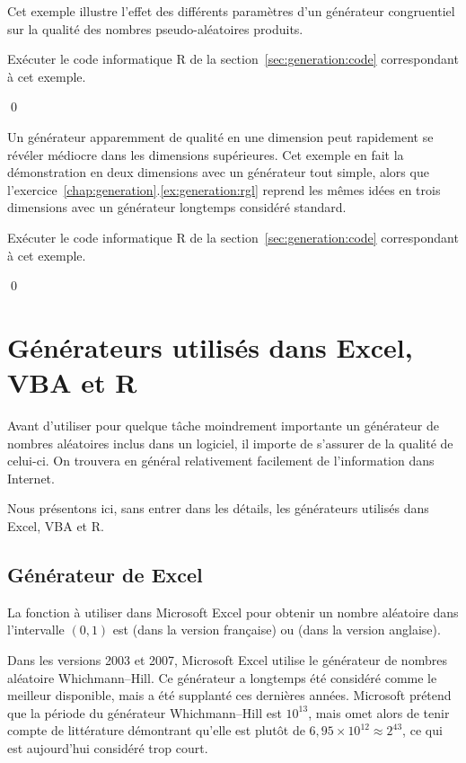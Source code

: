 \begin{exemple}
  \label{exemple:generation:rand}
  Cet exemple illustre l'effet des différents paramètres d'un
  générateur congruentiel sur la qualité des nombres pseudo-aléatoires
  produits.

  \begin{gotoR}
    Exécuter le code informatique R de la
    section~\ref{sec:generation:code} correspondant à cet exemple.
  \end{gotoR}
  \qed
\end{exemple}

\begin{exemple}
  Un générateur apparemment de qualité en une dimension peut
  rapidement se révéler médiocre dans les dimensions supérieures. Cet
  exemple en fait la démonstration en deux dimensions avec un
  générateur tout simple, alors que
  l'exercice~\ref{chap:generation}.\ref{ex:generation:rgl} reprend les
  mêmes idées en trois dimensions avec un générateur longtemps
  considéré standard.

  \begin{gotoR}
    Exécuter le code informatique R de la
    section~\ref{sec:generation:code} correspondant à cet exemple.
  \end{gotoR}
  \qed
\end{exemple}


\section{Générateurs utilisés dans Excel, VBA et R}

Avant d'utiliser pour quelque tâche moindrement importante un
générateur de nombres aléatoires inclus dans un logiciel, il importe
de s'assurer de la qualité de celui-ci. On trouvera en général
relativement facilement de l'information dans Internet.

Nous présentons ici, sans entrer dans les détails, les générateurs
utilisés dans Excel, VBA et R.

\subsection{Générateur de Excel}

La fonction à utiliser dans Microsoft Excel pour obtenir un nombre
aléatoire dans l'intervalle $(0, 1)$ est  (dans la
version française) ou  (dans la version anglaise).

Dans les versions 2003 et 2007, Microsoft Excel utilise le générateur
de nombres aléatoire Whichmann--Hill. Ce générateur a longtemps été
considéré comme le meilleur disponible, mais a été supplanté ces
dernières années. Microsoft prétend que la période du générateur
Whichmann--Hill est $10^{13}$, mais omet alors de tenir compte de
littérature démontrant qu'elle est plutôt de $6,95 \times 10^{12}
\approx 2^{43}$, ce qui est aujourd'hui considéré trop court.

